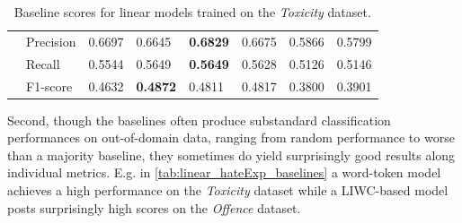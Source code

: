 \begin{table}[]
\begin{minipage}{0.42\paperheight}
{\begin{tabular}{ll|ll|ll|ll}
                                        & Precision & 0.6697 & 0.6645            & \bf{0.6829} & 0.6675      & 0.5866 & 0.5799          \\
                                        & Recall    & 0.5544 & 0.5649            & \bf{0.5649} & 0.5628      & 0.5126 & 0.5146          \\
                                        & F1-score  & 0.4632 & \bf{0.4872}       & 0.4811      & 0.4817      & 0.3800 & 0.3901
    \end{tabular}%
    }
    \caption{Baseline scores for linear models trained on the \textit{Toxicity} dataset.}
    \label{tab:linear_toxicity_baselines}
    \end{minipage}
\end{table}

Second, though the baselines often produce substandard classification performances on out-of-domain data, ranging from random performance to worse than a majority baseline, they sometimes do yield surprisingly good results along individual metrics. E.g. in \cref{tab:linear_hateExp_baselines} a word-token model achieves a high performance on the \textit{Toxicity} dataset while a LIWC-based model posts surprisingly high scores on the \textit{Offence} dataset.

